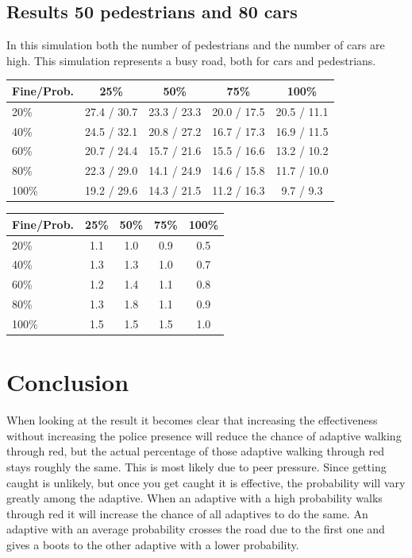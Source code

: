 \documentclass[a4paper]{article}
\begin{document}
\subsection{Results 50 pedestrians and 80 cars}
In this simulation both the number of pedestrians and the number of cars are high. This simulation represents a busy road, both for cars and pedestrians.

\begin{table}[H]
\centering
\begin{tabular}{ l | c c c c }
  Fine\slash Prob. & 25\% & 50\% & 75\% & 100\% \\ 
  \hline
  20\%  & 27.4 / 30.7 & 23.3 / 23.3 & 20.0 / 17.5 & 20.5 / 11.1  \\
  40\%  & 24.5 / 32.1 & 20.8 / 27.2 & 16.7 / 17.3 & 16.9 / 11.5  \\
  60\%  & 20.7 / 24.4 & 15.7 / 21.6 & 15.5 / 16.6 & 13.2 / 10.2  \\
  80\%  & 22.3 / 29.0 & 14.1 / 24.9 & 14.6 / 15.8 & 11.7 / 10.0  \\
  100\% & 19.2 / 29.6 & 14.3 / 21.5 & 11.2 / 16.3 &  9.7 /  9.3  \\
\end{tabular}
\end{table}

\begin{table}[H]
\centering
\begin{tabular}{ l | c c c c }
  Fine\slash Prob. & 25\% & 50\% & 75\% & 100\% \\ 
  \hline
  20\%  & 1.1 & 1.0 & 0.9 & 0.5  \\
  40\%  & 1.3 & 1.3 & 1.0 & 0.7  \\
  60\%  & 1.2 & 1.4 & 1.1 & 0.8  \\
  80\%  & 1.3 & 1.8 & 1.1 & 0.9  \\
  100\% & 1.5 & 1.5 & 1.5 & 1.0  \\
\end{tabular}
\end{table}

\clearpage

\section{Conclusion}
When looking at the result it becomes clear that increasing the effectiveness without increasing the police presence will reduce the chance of adaptive walking through red, but the actual percentage of those adaptive walking through red stays roughly the same. This is most likely due to peer pressure. Since getting caught is unlikely, but once you get caught it is effective, the probability will vary greatly among the adaptive. When an adaptive with a high probability walks through red it will increase the chance of all adaptives to do the same. An adaptive with an average probability crosses the road due to the first one and gives a boots to the other adaptive with a lower probability.
\end{document}
